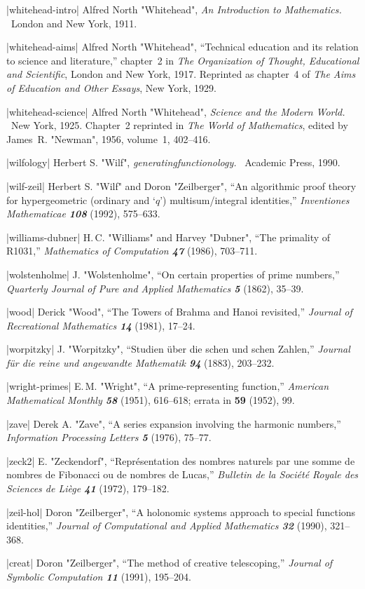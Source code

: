 \bib|whitehead-intro|%
Alfred North "Whitehead", {\sl An Introduction to Mathematics.} \
London and New York, 1911.

\bib|whitehead-aims|%
Alfred North "Whitehead", ``Technical education and its relation to
science and literature,'' chapter~2 in {\sl The Organization of Thought,
Educational and Scientific},
London and New York, 1917. Reprinted as chapter~4 of %
 {\sl The Aims of Education and Other Essays}, New York, 1929. %

\bib|whitehead-science|%
Alfred North "Whitehead", {\sl Science and the Modern World.} \
New York, 1925. Chapter~2 reprinted in {\sl The World of Mathematics},
edited by James~R. "Newman", 1956, volume~1, 402--416.

\bib|wilfology|%
Herbert S. "Wilf", {\sl generatingfunctionology.} \ Academic Press, 1990.

\bib|wilf-zeil|%
Herbert S. "Wilf" and Doron "Zeilberger", ``An algorithmic proof theory for
hypergeometric (ordinary and `$q$') multisum/integral identities,''
{\sl Inventiones Mathematicae\/ \bf108} (1992), 575--633.

\bib|williams-dubner|%
H.\,C. "Williams" and Harvey "Dubner", ``The primality of R1031,''
{\sl Mathematics of Computation\/ \bf47} (1986), 703--711.

\bib|wolstenholme|%
J. "Wolstenholme", ``On certain properties of prime numbers,''
{\sl Quarterly Journal of Pure and Applied Mathematics\/ \bf5}
(1862), 35--39.

\bib|wood|%
Derick "Wood", ``The Towers of Brahma and Hanoi revisited,''
{\sl Journal of Recreational Mathematics \bf14} (1981), 17--24.

\bib|worpitzky|%
J. \?"Worpitzky", \?``Studien \?\"uber \?die \?schen \?und 
\?\?{\it Euler\/}schen
\?Zahlen,'' {\sl Journal f\"ur die reine und angewandte Mathematik\/ \bf94}
(1883), 203--232.

\bib|wright-primes|%
E.\,M. "Wright", ``A prime-representing function,''
{\sl American Mathematical Monthly\/ \bf58} (1951), 616--618;
errata in {\bf59} (1952), 99.


\bib|zave|%
Derek A. "Zave", ``A series expansion involving the harmonic numbers,''
{\sl Information Processing Letters\/ \bf5} (1976), 75--77.

\bib|zeck2|%
E. "Zeckendorf", ``Repr\'esentation des nombres naturels par une somme de
nombres de Fibonacci ou de nombres de Lucas,''
{\sl Bulletin de la Soci\'et\'e Royale des Sciences de Li\`ege\/ \bf41}
(1972), 179--182.

\bib|zeil-hol|%
Doron "Zeilberger", ``A holonomic systems approach to special functions
identities,'' {\sl Journal of Computational and Applied Mathematics\/ \bf32}
(1990), 321--368.

\bib|creat|%
Doron "Zeilberger", ``The method of creative telescoping,''
{\sl Journal of Symbolic Computation\/ \bf11} (1991), 195--204.


\bye
